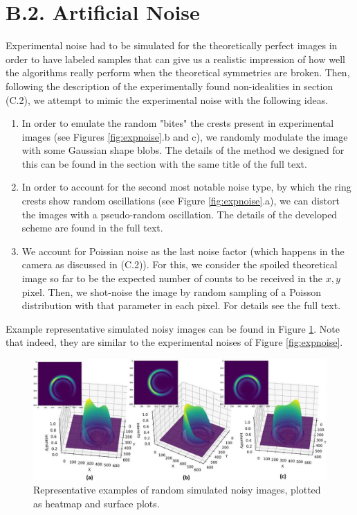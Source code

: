 \documentclass[11pt, a4paper, twoside]{article} %
\begin{document}
\section*{B.2. Artificial Noise \vspace{-0.3cm}
}
Experimental noise had to be simulated for the theoretically perfect images in order to have labeled samples that can  give us a realistic impression of how well the algorithms really perform when the theoretical symmetries are broken. Then, following the description of the experimentally found non-idealities in section (C.2), we attempt to mimic the experimental noise with the following ideas. \vspace{-0.3cm}
\begin{enumerate}
\item In order to emulate the random "bites" the crests present in experimental images (see Figures \ref{fig:expnoise}.b and c), we randomly modulate the image with some Gaussian shape blobs. The details of the method we designed for this can be found in the section with the same title of the full text.
\item In order to account for the second most notable noise type, by which the ring crests show random oscillations (see Figure \ref{fig:expnoise}.a), we can distort the images with a pseudo-random oscillation. The details of the developed scheme are found in the full text.

\item We account for Poissian noise as the last noise factor (which happens in the camera as discussed in (C.2)). For this, we consider the spoiled theoretical image so far to be the expected number of counts to be received in the $x,y$ pixel. Then, we shot-noise the image by random sampling of a Poisson distribution with that parameter in each pixel. For details see the full text. \vspace{-0.3cm}
\end{enumerate}
Example representative simulated noisy images can be found in Figure \ref{fig:artifNoise}. Note that indeed, they are similar to the experimental noises of Figure \ref{fig:expnoise}.

\begin{figure}[h!] 
     \centering 
    \includegraphics[width=0.9\linewidth]{artif.jpg}
    \caption{Representative examples of random simulated noisy images, plotted as heatmap and surface plots.}\vspace{-0.3cm}
    \label{fig:artifNoise}
\end{figure}
\end{document}
